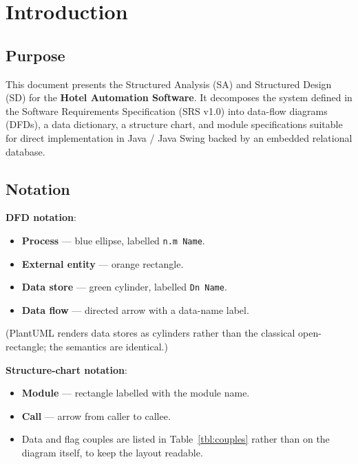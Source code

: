 \documentclass[12pt,a4paper]{article}
\begin{document}
\thispagestyle{fancy}
\tableofcontents
\newpage

\section{Introduction}

\subsection{Purpose}

This document presents the Structured Analysis (SA) and Structured Design (SD) for the
\textbf{Hotel Automation Software}. It decomposes the system defined in the Software
Requirements Specification (SRS v1.0) into data-flow diagrams (DFDs), a data
dictionary, a structure chart, and module specifications suitable for direct
implementation in Java / Java Swing backed by an embedded relational database.

\subsection{Notation}

\textbf{DFD notation}:
\begin{itemize}[leftmargin=1.5em]
  \item \textbf{Process} --- blue ellipse, labelled \texttt{n.m Name}.
  \item \textbf{External entity} --- orange rectangle.
  \item \textbf{Data store} --- green cylinder, labelled \texttt{Dn Name}.
  \item \textbf{Data flow} --- directed arrow with a data-name label.
\end{itemize}
(PlantUML renders data stores as cylinders rather than the classical open-rectangle;
the semantics are identical.)

\noindent\textbf{Structure-chart notation}:
\begin{itemize}[leftmargin=1.5em]
  \item \textbf{Module} --- rectangle labelled with the module name.
  \item \textbf{Call} --- arrow from caller to callee.
  \item Data and flag couples are listed in Table~\ref{tbl:couples} rather than on the
        diagram itself, to keep the layout readable.
\end{itemize}
\end{document}
